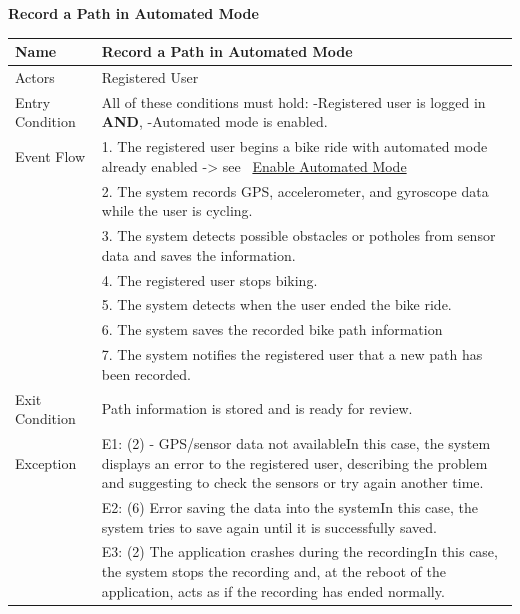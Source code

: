 \begin{enumerate}[label=\textbf{[UC\arabic*]}]
    \item \textbf{Record a Path in Automated Mode}
            \begin{center}
                \begin{tabular}{|p{4cm}|p{11cm}|}
                    \hline
                    \textbf{Name} & \textbf{Record a Path in Automated Mode} \\
                    \hline
                    Actors & Registered User \\
                    \hline
                    Entry Condition & All of these conditions must hold: \newline -Registered user is logged in \textbf{AND}, \newline -Automated mode is enabled.\\
                    \hline
                    Event Flow & 1. The registered user begins a bike ride with automated mode already enabled -> see ~\hyperref[EAM]{Enable Automated Mode} \\
                    & 2. The system records GPS, accelerometer, and gyroscope data while the user is cycling. \\
                    & 3. The system detects possible obstacles or potholes from sensor data and saves the information. \\
                    & 4. The registered user stops biking. \\
                    & 5. The system detects when the user ended the bike ride. \\
                    & 6. The system saves the recorded bike path information \\
                    & 7. The system notifies the registered user that a new path has been recorded. \\
                    \hline
                    Exit Condition & Path information is stored and is ready for review. \\
                    \hline
                    Exception & E1: (2) - GPS/sensor data not available\newline In this case, the system displays an error to the registered user, describing the problem and suggesting to check the sensors or try again another time. \\
                    & E2: (6) Error saving the data into the system\newline In this case, the system tries to save again until it is successfully saved. \\
                    & E3: (2) The application crashes during the recording\newline In this case, the system stops the recording and, at the reboot of the application, acts as if the recording has ended normally. \\

\end{tabular}
\end{center}
\end{enumerate}
